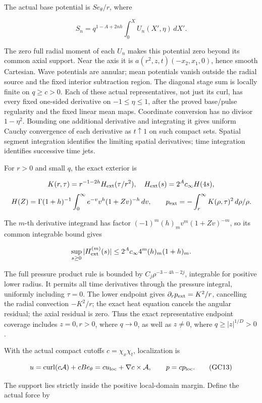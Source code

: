\documentclass[10pt,a4paper]{article}
\begin{document}
The actual base potential is \(S e_\theta/r\), where

\[
S_n=q^{1-A+2nh}\int_0^XU_n(X',\eta)\,dX'.
\]

The zero full radial moment of each \(U_n\) makes this potential zero beyond its common axial support. Near the axis it is \(a(r^2,z,t)(-x_2,x_1,0)\), hence smooth Cartesian. Wave potentials are annular; mean potentials vanish outside the radial source and the fixed interior subtraction region. The diagonal stage sum is locally finite on \(q\ge c>0\). Each of these actual representatives, not just its curl, has every fixed one-sided derivative on \(-1\le\eta\le1\), after the proved base/pulse regularity and the fixed linear mean maps. Coordinate conversion has no divisor \(1-\eta^2\). Bounding one additional derivative and integrating it gives uniform Cauchy convergence of each derivative as \(t\uparrow1\) on such compact sets. Spatial segment integration identifies the limiting spatial derivatives; time integration identifies successive time jets.

For \(r>0\) and small \(q\), the exact exterior is

\[
K(r,\tau)=r^{-1-2h}H_{\rm ext}(\tau/r^2),
\quad H_{\rm ext}(s)=2^Ac_\infty H(4s),
\] \[
H(Z)=\Gamma(1+h)^{-1}\int_0^\infty
e^{-v}v^h(1+Zv)^{-h}\,dv,
\qquad
p_{\rm ext}=-\int_r^\infty K(\rho,\tau)^2\,d\rho/\rho.
\]

The \(m\)-th derivative integrand has factor \((-1)^m(h)_mv^m(1+Zv)^{-m}\), so its common integrable bound gives

\[
\sup_{s\ge0}|H_{\rm ext}^{(m)}(s)|
\le2^Ac_\infty4^m(h)_m(1+h)_m.
\]

The full pressure product rule is bounded by \(C_j\rho^{-3-4h-2j}\), integrable for positive lower radius. It permits all time derivatives through the pressure integral, uniformly including \(\tau=0\). The lower endpoint gives \(\partial_rp_{\rm ext}=K^2/r\), cancelling the radial convection \(-K^2/r\); the exact heat equation cancels the angular residual; the axial residual is zero. Thus the exact representative endpoint coverage includes \(z=0,r>0\), where \(q\to0\), as well as \(z\ne0\), where \(q\ge|z|^{1/D}>0\).

With the actual compact cutoffs \(c=\chi_x\chi_t\), localization is

\[
u=\operatorname{curl}(c\mathcal A)+cBe_\theta
=cu_{\rm loc}+\nabla c\times\mathcal A,
\qquad p=cp_{\rm loc}.
\tag{GC13}
\]

The support lies strictly inside the positive local-domain margin. Define the actual force by
\end{document}

